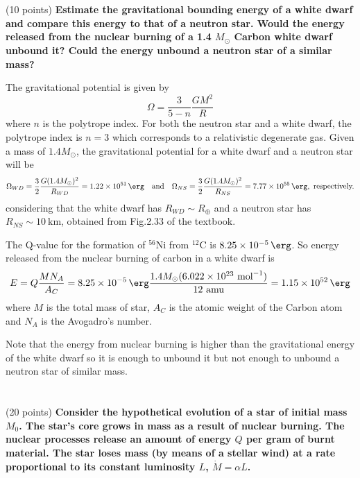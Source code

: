 \section{}(10 points)
\textbf{Estimate the gravitational bounding energy of a white dwarf and compare this energy to that of a neutron star. Would the energy released from the nuclear burning of a 1.4 $M_\odot$ Carbon white dwarf unbound it? Could the energy unbound a neutron star
of a similar mass?}

The gravitational potential is given by
\begin{equation*}
    \Omega = \frac{3}{5-n}\frac{GM^2}{R}
\end{equation*}
where $n$ is the polytrope index. For both the neutron star and a white dwarf, the polytrope index is $n=3$  which corresponds to a relativistic degenerate gas. Given a mass of $1.4M_\odot$, the gravitational potential for a white dwarf and a neutron star will be 
\begin{equation*}
    \Omega_{WD}=\frac{3}{2}\frac{G(1.4M_\odot)^2}{R_{WD}}=\SI{1.22e+51}{\erg} \quad\text{and}\quad \Omega_{NS}=\frac{3}{2}\frac{G(1.4M_\odot)^2}{R_{NS}} =\SI{7.77e+55}{\erg} , \text{ respectively.}
\end{equation*}
considering that the white dwarf has $R_{WD}\sim R_\oplus$ and a neutron star has $R_{NS} \sim \SI{10}{\km}$, obtained from Fig.2.33 of the textbook.

The Q-value for the formation of ${}^{56}\mathrm{Ni}$ from ${}^{12}\mathrm{C}$ is $\SI{8.25e-5}{\erg}$. So energy released from the nuclear burning of carbon in a white dwarf is
\begin{equation*}
    E = Q\frac{M N_A}{A_C} = \SI{8.25e-5}{\erg}\frac{1.4M_\odot( \num{6.022e23}\text{ mol}^{-1})}{12 \text{ amu}} = \SI{1.15e+52}{\erg}
\end{equation*}
where $M$ is the total mass of star, $A_C$ is the atomic weight of the Carbon atom and $N_A$ is the Avogadro's number.

Note that the energy from nuclear burning is higher than the gravitational energy of the white dwarf so it is enough to unbound it but not enough to unbound a neutron star of similar mass.


\newpage
\section{}(20 points)
\textbf{Consider the hypothetical evolution of a star of initial mass $M_0$.
The star's core grows in mass as a result of nuclear burning.
The nuclear processes release an amount of energy $Q$ per gram of burnt material. 
The star loses mass (by means of a stellar wind) at a rate proportional to its constant luminosity $L$, $\Dot{M} = \alpha L$.}
